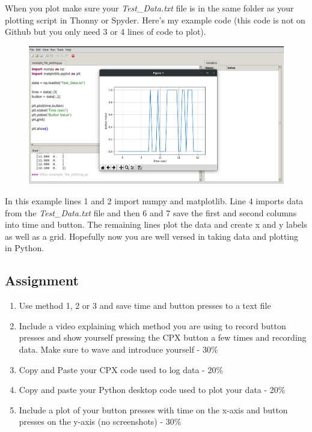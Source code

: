When you plot make sure your {\it Test\_Data.txt} file is in the same folder
as your plotting script in Thonny or Spyder. Here’s my example code
(this code is not on Github but you only need 3 or 4 lines of code to plot). 
\begin{figure}[H]
  \begin{center}
    \includegraphics[width=\textwidth]{Figures/plotdata.png}
  \end{center}
\end{figure}
In this example lines 1 and 2 import numpy and matplotlib. Line 4
imports data from the {\it Test\_Data.txt} file and then 6 and 7 save the
first and second columns into time and button. The remaining lines
plot the data and create x and y labels as well as a grid. Hopefully
now you are well versed in taking data and plotting in Python.

\subsection{Assignment}



\begin{enumerate}[itemsep=-5pt]
\item Use method 1, 2 or 3 and save time and button presses to a text file
\item Include a video explaining which method you are using to record button presses and show yourself pressing the CPX button a few times and recording data. Make sure to wave and introduce yourself - 30\%
\item Copy and Paste your CPX code used to log data - 20\%
\item Copy and paste your Python desktop code used to plot your data - 20\%
\item Include a plot of your button presses with time on the x-axis and button presses on the y-axis (no screenshots) - 30\%
\end{enumerate}

